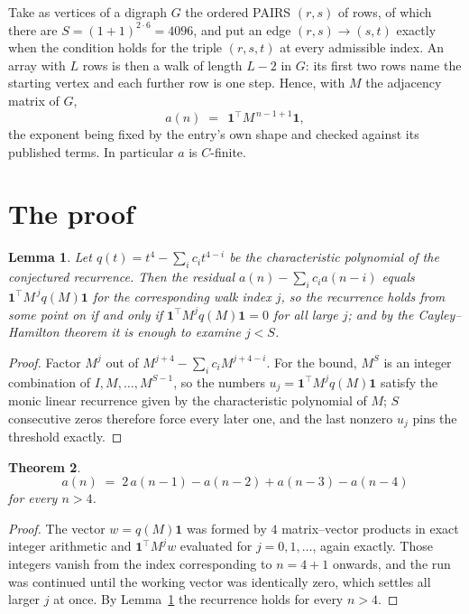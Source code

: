 \documentclass[11pt,a4paper]{article}
\theoremstyle{plain}
\newtheorem{theorem}{Theorem}
\newtheorem{lemma}[theorem]{Lemma}
\theoremstyle{definition}
\begin{document}
Take as vertices of a digraph $G$ the ordered PAIRS $(r,s)$ of rows, of which there are
$S=(1+1)^{2\cdot6}=4096$, and put an edge $(r,s)\to(s,t)$ exactly when the condition
holds for the triple $(r,s,t)$ at every admissible index. An array with $L$ rows is then a
walk of length $L-2$ in $G$: its first two rows name the starting vertex and each further
row is one step. Hence, with $M$ the adjacency matrix of $G$,
\[
a(n)\;=\;\,\mathbf{1}^{\!\top}M^{\,n-1+1}\mathbf{1},
\]
the exponent being fixed by the entry's own shape and checked against its published terms.
In particular $a$ is $C$-finite.

\section{The proof}

\begin{lemma}\label{lem:crit}
Let $q(t)=t^{4}-\sum_i c_it^{4-i}$ be the characteristic polynomial of the
conjectured recurrence. Then the residual $a(n)-\sum_ic_ia(n-i)$ equals
$\mathbf{1}^{\!\top}M^{\,j}q(M)\mathbf{1}$ for the corresponding walk index
$j$, so the recurrence holds from some point on if and only if
$\mathbf{1}^{\!\top}M^{j}q(M)\mathbf{1}=0$ for all large $j$; and by the
Cayley--Hamilton theorem it is enough to examine $j<S$.
\end{lemma}

\begin{proof}
Factor $M^{j}$ out of $M^{j+4}-\sum_ic_iM^{j+4-i}$. For the bound, $M^{S}$
is an integer combination of $I,M,\dots,M^{S-1}$, so the numbers
$u_j=\mathbf{1}^{\!\top}M^{j}q(M)\mathbf{1}$ satisfy the monic linear recurrence given by
the characteristic polynomial of $M$; $S$ consecutive zeros therefore force every later one,
and the last nonzero $u_j$ pins the threshold exactly.
\end{proof}

\begin{theorem}
\[
a(n)\;=\;2\,a(n-1) - a(n-2) + a(n-3) - a(n-4)
\]
for every $n>4$.
\end{theorem}

\begin{proof}
The vector $w=q(M)\mathbf{1}$ was formed by $4$ matrix--vector products in exact
integer arithmetic and $\mathbf{1}^{\!\top}M^{j}w$ evaluated for $j=0,1,\dots$, again
exactly. Those integers vanish from the index corresponding to $n=4+1$ onwards, and the
run was continued until the working vector was identically zero, which settles all larger $j$
at once. By Lemma~\ref{lem:crit} the recurrence holds for every $n>4$.
\end{proof}
\end{document}
